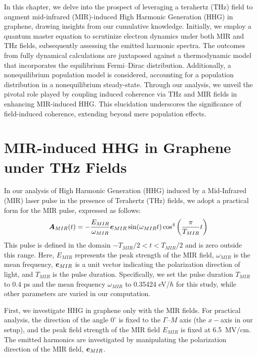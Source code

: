In this chapter, we delve into the prospect of leveraging a terahertz (THz) field to augment mid-infrared (MIR)-induced High Harmonic Generation (HHG) in graphene, drawing insights from our cumulative knowledge. Initially, we employ a quantum master equation to scrutinize electron dynamics under both MIR and THz fields, subsequently assessing the emitted harmonic spectra. The outcomes from fully dynamical calculations are juxtaposed against a thermodynamic model that incorporates the equilibrium Fermi--Dirac distribution. Additionally, a nonequilibrium population model is considered, accounting for a population distribution in a nonequilibrium steady-state. Through our analysis, we unveil the pivotal role played by coupling induced coherence via THz and MIR fields in enhancing MIR-induced HHG. This elucidation underscores the significance of field-induced coherence, extending beyond mere population effects.
\section{MIR-induced HHG in Graphene under THz Fields}

In our analysis of High Harmonic Generation (HHG) induced by a Mid-Infrared (MIR) laser pulse in the presence of Terahertz (THz) fields, we adopt a practical form for the MIR pulse, expressed as follows:
\begin{align}
  \boldsymbol A_{MIR}(t) = -\frac{E_{MIR}}{\omega_{MIR}} \boldsymbol{e}_{MIR} 
\sin(\omega_{MIR} t) \cos^4 \left (\frac{\pi}{T_{MIR}} t \right)
  \label{eqn:laser_pulse}
\end{align}
This pulse is defined in the domain $-T_{MIR}/2<t<T_{MIR}/2$ and is zero outside this range.
Here, $E_{MIR}$ represents the peak strength of the MIR field, $\omega_{MIR}$ is the mean
frequency, $\boldsymbol e_{MIR}$ is a unit vector indicating the polarization direction of light, and
$T_{MIR}$ is the pulse duration. Specifically, we set the pulse duration $T_{MIR}$ to 0.4 ps and
the mean frequency $\omega_{MIR}$ to 0.35424 eV/$\hbar$ for this study, while other parameters are
varied in our computation.

First, we investigate HHG in graphene only with the MIR fields. For practical analysis, the
direction of the angle $0^\circ$ is fixed to the $\Gamma$--$M$ axis (the $x-$axis in our setup), and the peak field strength of the MIR field $E_{MIR}$ is fixed at 6.5~MV/cm. The emitted harmonics are investigated by manipulating the polarization direction of the MIR field, $\boldsymbol e_{MIR}$.

